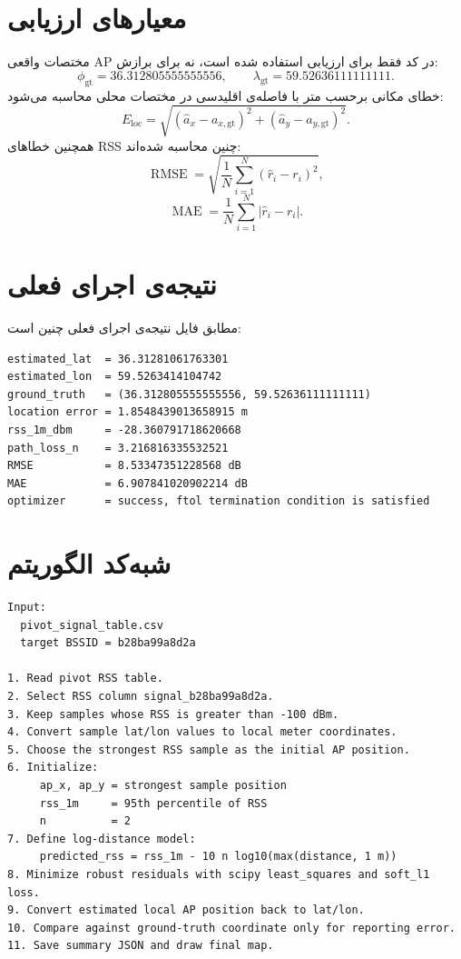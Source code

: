 \documentclass[12pt,a4paper]{article}
\begin{document}
\section{معیارهای ارزیابی}
مختصات واقعی AP در کد فقط برای ارزیابی استفاده شده است، نه برای برازش:
\[
\phi_{\text{gt}}=36.312805555555556,
\qquad
\lambda_{\text{gt}}=59.52636111111111.
\]
خطای مکانی برحسب متر با فاصله‌ی اقلیدسی در مختصات محلی محاسبه می‌شود:
\[
E_{\text{loc}}=
\sqrt{(\hat a_x-a_{x,\text{gt}})^2+(\hat a_y-a_{y,\text{gt}})^2}.
\]
همچنین خطاهای RSS چنین محاسبه شده‌اند:
\[
\operatorname{RMSE}=
\sqrt{\frac{1}{N}\sum_{i=1}^{N}(\hat r_i-r_i)^2},
\]
\[
\operatorname{MAE}=
\frac{1}{N}\sum_{i=1}^{N}|\hat r_i-r_i|.
\]

\section{نتیجه‌ی اجرای فعلی}
مطابق فایل
نتیجه‌ی اجرای فعلی چنین است:
\begin{latin}
\begin{verbatim}
estimated_lat  = 36.31281061763301
estimated_lon  = 59.5263414104742
ground_truth   = (36.312805555555556, 59.52636111111111)
location error = 1.8548439013658915 m
rss_1m_dbm     = -28.360791718620668
path_loss_n    = 3.216816335532521
RMSE           = 8.53347351228568 dB
MAE            = 6.907841020902214 dB
optimizer      = success, ftol termination condition is satisfied
\end{verbatim}
\end{latin}

\section{شبه‌کد الگوریتم}
\begin{latin}
\begin{verbatim}
Input:
  pivot_signal_table.csv
  target BSSID = b28ba99a8d2a

1. Read pivot RSS table.
2. Select RSS column signal_b28ba99a8d2a.
3. Keep samples whose RSS is greater than -100 dBm.
4. Convert sample lat/lon values to local meter coordinates.
5. Choose the strongest RSS sample as the initial AP position.
6. Initialize:
     ap_x, ap_y = strongest sample position
     rss_1m     = 95th percentile of RSS
     n          = 2
7. Define log-distance model:
     predicted_rss = rss_1m - 10 n log10(max(distance, 1 m))
8. Minimize robust residuals with scipy least_squares and soft_l1 loss.
9. Convert estimated local AP position back to lat/lon.
10. Compare against ground-truth coordinate only for reporting error.
11. Save summary JSON and draw final map.
\end{verbatim}
\end{latin}
\end{document}

